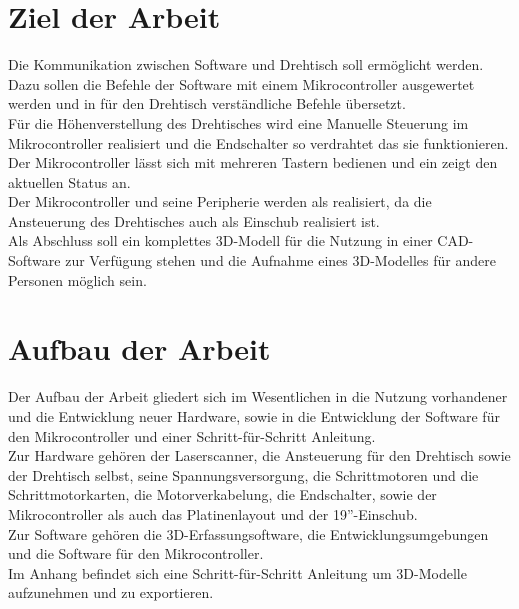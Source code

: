 \section{Ziel der Arbeit}
\label{sec:ZielDerArbeit}
Die Kommunikation zwischen Software und Drehtisch soll ermöglicht werden. Dazu sollen die Befehle der Software mit einem Mikrocontroller ausgewertet werden und in für den Drehtisch verständliche Befehle übersetzt.\\
Für die Höhenverstellung des Drehtisches wird eine Manuelle Steuerung im Mikrocontroller realisiert und die Endschalter so verdrahtet das sie funktionieren. \\
Der Mikrocontroller lässt sich mit mehreren Tastern bedienen und ein  zeigt den aktuellen Status an.\\
Der Mikrocontroller und seine Peripherie werden als  realisiert, da die Ansteuerung des Drehtisches auch als Einschub realisiert ist.\\
Als Abschluss soll ein komplettes 3D-Modell für die Nutzung in einer CAD-Software zur Verfügung stehen und die Aufnahme eines 3D-Modelles für andere Personen möglich sein.

\section{Aufbau der Arbeit}
\label{sec:AufbauDerArbeit}
Der Aufbau der Arbeit gliedert sich im Wesentlichen in die Nutzung vorhandener und die Entwicklung neuer Hardware, sowie in die Entwicklung der Software für den Mikrocontroller und einer Schritt-für-Schritt Anleitung. \\
Zur Hardware gehören der Laserscanner, die Ansteuerung für den Drehtisch sowie der Drehtisch selbst, seine Spannungsversorgung, die Schrittmotoren und die Schrittmotorkarten, die Motorverkabelung, die Endschalter, sowie der Mikrocontroller als auch das Platinenlayout und der 19''-Einschub.\\
Zur Software gehören die 3D-Erfassungsoftware, die Entwicklungsumgebungen und die Software für den Mikrocontroller.\\
Im Anhang befindet sich eine Schritt-für-Schritt Anleitung um 3D-Modelle aufzunehmen und zu exportieren.\\
